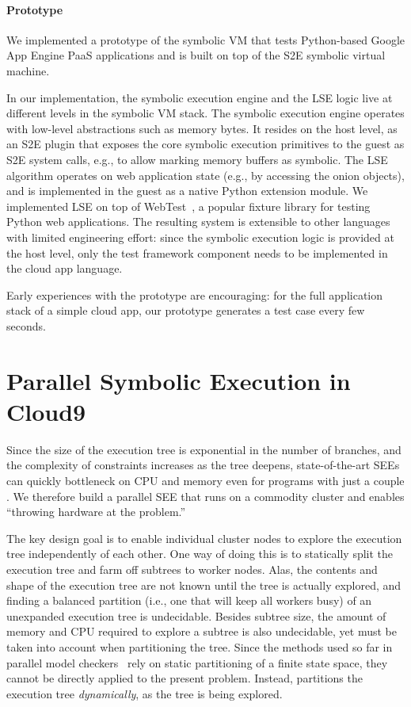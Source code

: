 \paragraph{Prototype}

We implemented a prototype of the symbolic VM that tests Python-based Google App Engine PaaS applications and is built on top of the S2E symbolic virtual machine.

In our implementation, the symbolic execution engine and the LSE logic live at different levels in the symbolic VM stack.
%
The symbolic execution engine operates with low-level abstractions such as memory bytes. It resides on the host level, as an S2E plugin that exposes the core symbolic execution primitives to the guest as S2E system calls, e.g., to allow marking memory buffers as symbolic.
%
The LSE algorithm operates on web application state (e.g., by accessing the onion objects), and is implemented in the guest as a native Python extension module.  We implemented LSE on top of WebTest~\cite{py-webtest}, a popular fixture library for testing Python web applications.
%
The resulting system is extensible to other languages with limited engineering effort: since the symbolic execution logic is provided at the host level, only the test framework component needs to be implemented in the cloud app language.

Early experiences with the prototype are encouraging: for the full application stack of a simple cloud app, our prototype generates a test case every few seconds.


\section{Parallel Symbolic Execution in Cloud9}

Since the size of the execution tree is exponential in the number of branches, and the complexity of constraints increases as the tree deepens, state-of-the-art SEEs can quickly bottleneck on CPU and memory even for programs with just a couple \kloc.  We therefore build a parallel SEE that runs on a commodity cluster and enables ``throwing hardware at the problem.''

The key design goal is to enable individual cluster nodes to explore the execution tree independently of each other.  One way of doing this is to statically split the execution tree and farm off subtrees to worker nodes.  Alas, the contents and shape of the execution tree are not known until the tree is actually explored, and finding a balanced partition (i.e., one that will keep all workers busy) of an unexpanded execution tree is undecidable.  Besides subtree size, the amount of  memory and CPU required to explore a subtree is also undecidable, yet must be taken into account when partitioning the tree. Since the methods used so far in parallel model checkers~\cite{swarm,spin:multicore-modelchecking} rely on static partitioning of a finite state space, they cannot be directly applied to the present problem. Instead, \cnine partitions the execution tree {\em dynamically}, as the tree is being explored. 

